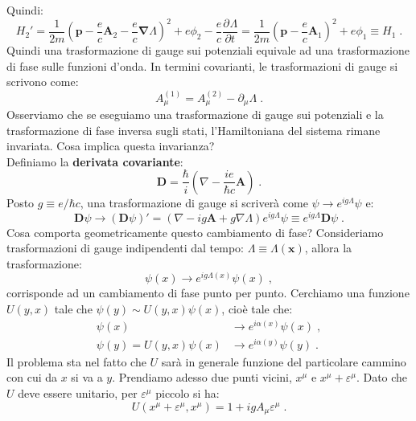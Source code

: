 \documentclass[12pt,a4paper]{report}
\theoremstyle{definition}
\newcommand{\pdev}[3][]{\frac{\partial^{#1} #2}{\partial #3^{#1}}}
\numberwithin{equation}{section}
\newcommand{\bnabla}{\boldsymbol{\nabla}}
\begin{document}
Quindi:
\begin{equation}
H_2'=\frac{1}{2m}\left(\mathbf{p}-\frac{e}{c}\mathbf{A}_2-\frac{e}{c}\bnabla\Lambda\right)^2+e\phi_2-\frac{e}{c}\pdev{\Lambda}{t}=\frac{1}{2m}\left(\mathbf{p}-\frac{e}{c}\mathbf{A}_1\right)^2+e\phi_1\equiv H_1\;.
\end{equation}
Quindi una trasformazione di gauge sui potenziali equivale ad una trasformazione di fase sulle funzioni d'onda. In termini covarianti, le trasformazioni di gauge si scrivono come:
\begin{equation}
A_{\mu}^{(1)}=A_{\mu}^{(2)}-\partial_{\mu}\Lambda\;.
\end{equation}
Osserviamo che se eseguiamo una trasformazione di gauge sui potenziali e la trasformazione di fase inversa sugli stati, l'Hamiltoniana del sistema rimane invariata. Cosa implica questa invarianza? \\
Definiamo la \textbf{derivata covariante}:
\begin{equation}
\mathbf{D}=\frac{\hbar}{i}\left(\nabla-\frac{ie}{\hbar c}\mathbf{A}\right)\;.
\end{equation}
Posto $g\equiv e/\hbar c$, una trasformazione di gauge si scriverà come $\psi\to e^{ig\Lambda}\psi$ e:
\begin{equation}
\mathbf{D}\psi\longrightarrow (\mathbf{D}\psi)'=(\nabla-ig\mathbf{A}+g\nabla\Lambda)e^{ig\Lambda}\psi\equiv e^{ig\Lambda}\mathbf{D}\psi\;.
\end{equation}
Cosa comporta geometricamente questo cambiamento di fase? Consideriamo trasformazioni di gauge indipendenti dal tempo: $\Lambda\equiv\Lambda(\mathbf{x})$, allora la trasformazione:
\begin{equation}
\psi(x)\longrightarrow e^{ig\Lambda(x)}\psi(x)\;,
\end{equation}
corrisponde ad un cambiamento di fase punto per punto. Cerchiamo una funzione $U(y,x)$ tale che $\psi(y)\sim U(y,x)\psi(x)$, cioè tale che:
\begin{align*}
\psi(x) &\longrightarrow e^{i\alpha(x)}\psi(x)\;, \\
\psi(y)=U(y,x)\psi(x) &\longrightarrow e^{i\alpha(y)}\psi(y)\;.
\end{align*}
Il problema sta nel fatto che $U$ sarà in generale funzione del particolare cammino con cui da $x$ si va a $y$. Prendiamo adesso due punti vicini, $x^{\mu}$ e $x^{\mu}+\varepsilon^{\mu}$. Dato che $U$ deve essere unitario, per $\varepsilon^{\mu}$ piccolo si ha:
\begin{equation}
U(x^{\mu}+\varepsilon^{\mu},x^{\mu})=1+igA_{\mu}\varepsilon^{\mu}\;.
\end{equation}
\end{document}
